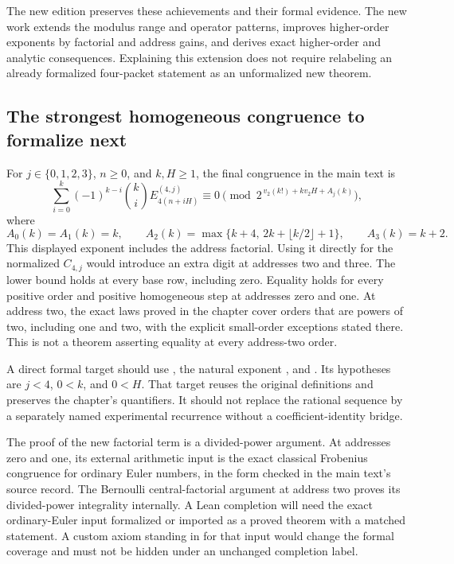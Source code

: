 The new edition preserves these achievements and their formal evidence. The new work extends the modulus range and operator patterns, improves higher-order exponents by factorial and address gains, and derives exact higher-order and analytic consequences. Explaining this extension does not require relabeling an already formalized four-packet statement as an unformalized new theorem.

\subsection{The strongest homogeneous congruence to formalize next}
For $j\in\{0,1,2,3\}$, $n\ge0$, and $k,H\ge1$, the final congruence in the main text is
\[
 \sum_{i=0}^k(-1)^{k-i}\binom{k}{i}
 E_{4(n+iH)}^{(4,j)}\equiv0
 \pmod{2^{\,v_2(k!)+k v_2H+A_j(k)}},
\]
where
\[
 A_0(k)=A_1(k)=k,\qquad
 A_2(k)=\max\{k+4,\,2k+\lfloor k/2\rfloor+1\},\qquad
 A_3(k)=k+2.
\]
This displayed exponent includes the address factorial. Using it directly for the normalized $C_{4,j}$ would introduce an extra digit at addresses two and three. The lower bound holds at every base row, including zero. Equality holds for every positive order and positive homogeneous step at addresses zero and one. At address two, the exact laws proved in the chapter cover orders that are powers of two, including one and two, with the explicit small-order exceptions stated there. This is not a theorem asserting equality at every address-two order.

A direct formal target should use , the natural exponent , and . Its hypotheses are $j<4$, $0<k$, and $0<H$. That target reuses the original definitions and preserves the chapter's quantifiers. It should not replace the rational sequence by a separately named experimental recurrence without a coefficient-identity bridge.

The proof of the new factorial term is a divided-power argument. At addresses zero and one, its external arithmetic input is the exact classical Frobenius congruence for ordinary Euler numbers, in the form checked in the main text's source record. The Bernoulli central-factorial argument at address two proves its divided-power integrality internally. A Lean completion will need the exact ordinary-Euler input formalized or imported as a proved theorem with a matched statement. A custom axiom standing in for that input would change the formal coverage and must not be hidden under an unchanged completion label.


